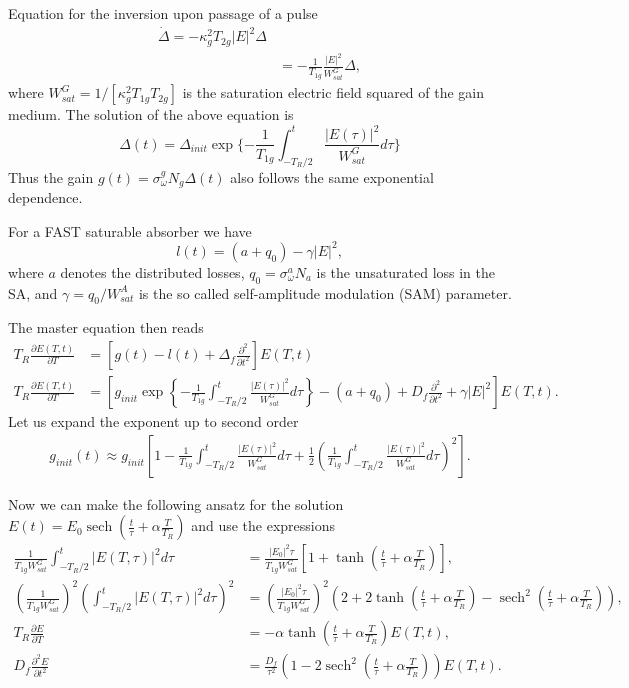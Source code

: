 \documentclass[preprint,secnumarabic,amssymb, nobibnotes, aip, prd]{revtex4-1}
\def\p{\partial}
\DeclareMathOperator{\sech}{sech}
\begin{document}
Equation for the inversion upon passage of a pulse 
\begin{align}
\dot \Delta = - \kappa_g^2T_{2g} |E|^2 \Delta  \nonumber \\
			&= - \frac{1}{T_{1g}}\frac{|E|^2}{W_{sat}^G}\Delta, 
\end{align}
where $W_{sat}^G = 1/[\kappa_g^2T_{1g}T_{2g}]$ is the saturation electric field squared of the gain medium. The solution of the above equation is 
\begin{equation}
\Delta(t) = \Delta_{init}\exp\{-\frac{1}{T_{1g}} \int_{-T_R/2}^{t} \frac{|E(\tau)|^2}{W_{sat}^G}d\tau\}
\end{equation}
Thus the gain $g(t) = \sigma_\omega^g N_g \Delta(t)$ also follows the same exponential dependence.  

For a FAST saturable absorber we have~\cite{haus1975theory}
\begin{equation}
l(t) = (a+q_0) -\gamma |E|^2,
\end{equation}
where $a$ denotes the distributed losses, $q_0 = \sigma_\omega^a N_a$ is the unsaturated loss in the SA, and $\gamma = q_0/W_{sat}^A$ is the so called self-amplitude modulation (SAM) parameter.



The master equation then reads
\begin{align}
\label{eq:master-equation}
T_R \frac{\p E(T,t)}{\p T} &= \left[g(t) - l(t) +\Delta_f \frac{\p^2}{\p t^2}\right]E(T,t) \nonumber \\
T_R \frac{\p E(T,t)}{\p T} &= \left[ g_{init}\exp\left \{-\frac{1}{T_{1g}} \int_{-T_R/2}^{t} \frac{|E(\tau)|^2}{W_{sat}^G}d\tau \right \} - (a+q_0)  +D_f \frac{\p^2}{\p t^2} +\gamma |E|^2\right]E(T,t).
\end{align}
Let us expand the exponent up to second order
\begin{align}
g_{init}(t) \approx  g_{init}\left [ 1-\frac{1}{T_{1g}} \int_{-T_R/2}^{t} \frac{|E(\tau)|^2}{W_{sat}^G}d\tau +\frac{1}{2} \left(\frac{1}{T_{1g}} \int_{-T_R/2}^{t} \frac{|E(\tau)|^2}{W_{sat}^G}d\tau\right)^2 \right ].
\end{align}

Now we can make the following ansatz for the solution $E(t) = E_0 \sech(\frac{t}{\tau} +\alpha \frac{T}{T_R})$ and use the expressions~\cite{haus1975theoryslow}
\begin{align}
\frac{1}{T_{1g}W_{sat}^G}\int_{-T_R/2}^{t} |E(T,\tau)|^2d\tau &= \frac{|E_0|^2\tau}{T_{1g}W_{sat}^G} [1+\tanh(\frac{t}{\tau}+\alpha \frac{T}{T_R})], \\ 
(\frac{1}{T_{1g}W_{sat}^G})^2\left (\int_{-T_R/2}^{t} |E(T,\tau)|^2d\tau \right)^2 &=  \left(\frac{|E_0|^2\tau}{T_{1g}W_{sat}^G}\right)^2 \left(2+2\tanh(\frac{t}{\tau}+\alpha \frac{T}{T_R}) - \sech^2(\frac{t}{\tau}+\alpha \frac{T}{T_R})\right), \\
T_R\frac{\p E}{\p T} &= -\alpha \tanh(\frac{t}{\tau}+\alpha \frac{T}{T_R}) E(T,t), \\
D_f\frac{\p^2 E}{\p t^2} &= \frac{D_f}{\tau^2}\left( 1-2\sech^2(\frac{t}{\tau}+\alpha \frac{T}{T_R}) \right) E(T,t).
\end{align}
\end{document}
